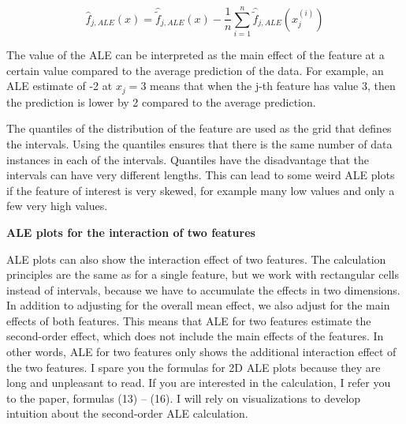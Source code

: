 \documentclass[12pt,]{krantz}
\begin{document}
\[\hat{f}_{j,ALE}(x)=\hat{\tilde{f}}_{j,ALE}(x)-\frac{1}{n}\sum_{i=1}^{n}\hat{\tilde{f}}_{j,ALE}(x^{(i)}_{j})\]

The value of the ALE can be interpreted as the main effect of the
feature at a certain value compared to the average prediction of the
data. For example, an ALE estimate of -2 at \(x_j=3\) means that when
the j-th feature has value 3, then the prediction is lower by 2 compared
to the average prediction.

The quantiles of the distribution of the feature are used as the grid
that defines the intervals. Using the quantiles ensures that there is
the same number of data instances in each of the intervals. Quantiles
have the disadvantage that the intervals can have very different
lengths. This can lead to some weird ALE plots if the feature of
interest is very skewed, for example many low values and only a few very
high values.

\textbf{ALE plots for the interaction of two features}

ALE plots can also show the interaction effect of two features. The
calculation principles are the same as for a single feature, but we work
with rectangular cells instead of intervals, because we have to
accumulate the effects in two dimensions. In addition to adjusting for
the overall mean effect, we also adjust for the main effects of both
features. This means that ALE for two features estimate the second-order
effect, which does not include the main effects of the features. In
other words, ALE for two features only shows the additional interaction
effect of the two features. I spare you the formulas for 2D ALE plots
because they are long and unpleasant to read. If you are interested in
the calculation, I refer you to the paper, formulas (13) -- (16). I will
rely on visualizations to develop intuition about the second-order ALE
calculation.
\end{document}
